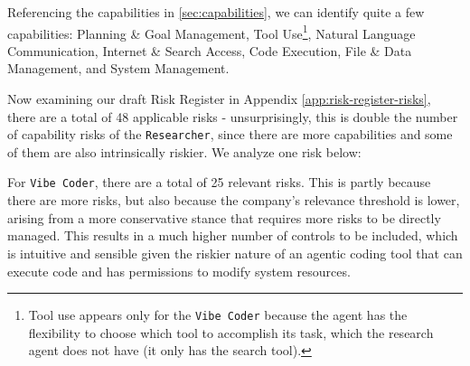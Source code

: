 \documentclass{article}
\begin{document}
Referencing the capabilities in \ref{sec:capabilities}, we can identify quite a few capabilities: Planning \& Goal Management, Tool Use\footnote{Tool use appears only for the \texttt{Vibe Coder} because the agent has the flexibility to choose which tool to accomplish its task, which the research agent does not have (it only has the search tool).}, Natural Language Communication, Internet \& Search Access, Code Execution, File \& Data Management, and System Management. 

Now examining our draft Risk Register in Appendix \ref{app:risk-register-risks}, there are a total of 48 applicable risks - unsurprisingly, this is double the number of capability risks of the \texttt{Researcher}, since there are more capabilities and some of them are also intrinsically riskier. We analyze one risk below:


For \texttt{Vibe Coder}, there are a total of 25 relevant risks. This is partly because there are more risks, but also because the company's relevance threshold is lower, arising from a more conservative stance that requires more risks to be directly managed. This results in a much higher number of controls to be included, which is intuitive and sensible given the riskier nature of an agentic coding tool that can execute code and has permissions to modify system resources.
\end{document}
